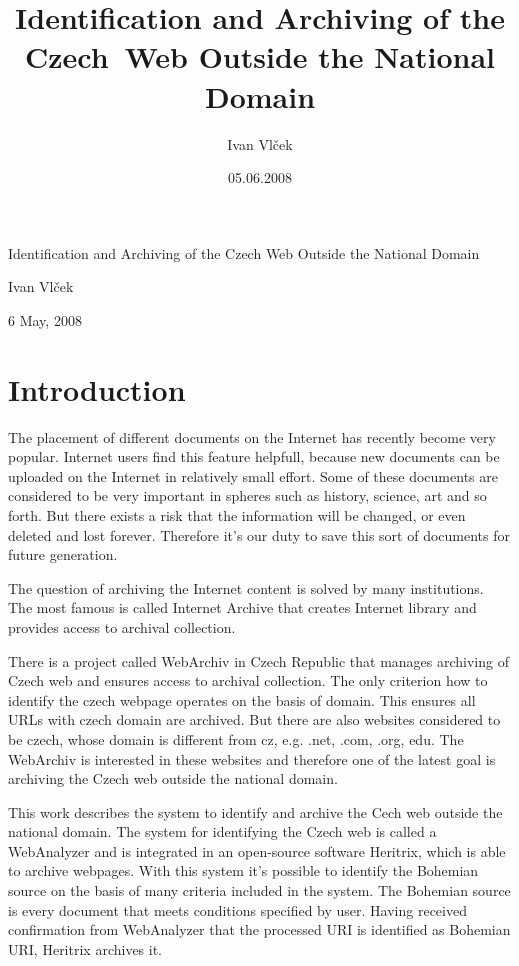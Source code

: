 \documentclass[11pt,a4paper]{article}
\title{Identification and Archiving of the Czech~Web Outside the National Domain}
\author{Ivan Vlček}
\date{05.06.2008}
\begin{document}
\begin{center}
\thispagestyle{empty}

\huge{Identification and Archiving of the Czech Web Outside the National Domain}

\vspace{5em}

\large{Ivan Vlček}

\normalsize{6 May, 2008}

\newpage
\thispagestyle{empty}
\tableofcontents

\end{center}
\newpage


\section{Introduction}

The placement of different documents on the Internet has recently become very popular. Internet users find this feature helpfull, because new documents can be uploaded on the Internet in relatively small effort. Some of these documents are considered to be very important in spheres such as hi\-sto\-ry, science, art and so forth. But there exists a risk that the information will be changed, or even deleted and lost forever. Therefore it's our duty to save this sort of documents for future generation.

The question of archiving the Internet content is solved by many institutions. The most famous is called Internet Archive that creates Internet library and provides access to archival collection.

There is a project called WebArchiv in Czech Republic that manages archiving of Czech web and ensures access to archival collection. The only criterion how to identify the czech webpage operates on the basis of domain. This ensures all URLs with czech domain are archived. But there are also websites considered to be czech, whose domain is different from cz, e.g. .net, .com, .org, edu. The WebArchiv is interested in these websites and therefore one of the latest goal is archiving the Czech web outside the national domain.

This work describes the system to identify and archive the Cech web outside the national domain. The system for identifying the Czech web is called a WebAnalyzer and is integrated in an open-source software Heritrix, which is able to archive webpages. With this system it's possible to identify the Bohemian source on the basis of many criteria included in the system. The Bohemian source is every document that meets conditions specified by user. Having received confirmation from WebAnalyzer that the processed URI is identified as Bohemian URI, Heritrix archives it.
\end{document}

